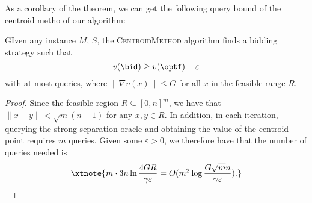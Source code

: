 As a corollary of the theorem, we can get the following query bound of the centroid metho of our algorithm:
\begin{corollary}
GIven any instance $M$, $S$, the \textsc{CentroidMethod} algorithm finds a bidding strategy such that
\[v(\bid) \geq v(\optf)-\varepsilon\]
with at most queries, where  $\|\nabla v(x)\| \leq G$ for all $x$ in the feasible range $R$.
\end{corollary}

\begin{proof}
Since the feasible region $R \subseteq [0,n]^m$, we have that $\|x-y\| < \sqrt{m}(n+1)$ for any $x, y \in R$. In addition, in each iteration, querying the strong separation oracle and obtaining the value of the centroid point requires $m$ queries. Given some $\varepsilon > 0$, we therefore have that the number of queries needed is 
\[
\xtnote{
m \cdot 3n \ln \frac{4GR}{\gamma\varepsilon} = O(m^2 \log \frac{G\sqrt{m}n}{\gamma\varepsilon}).}
\qedhere
\]
\end{proof}



